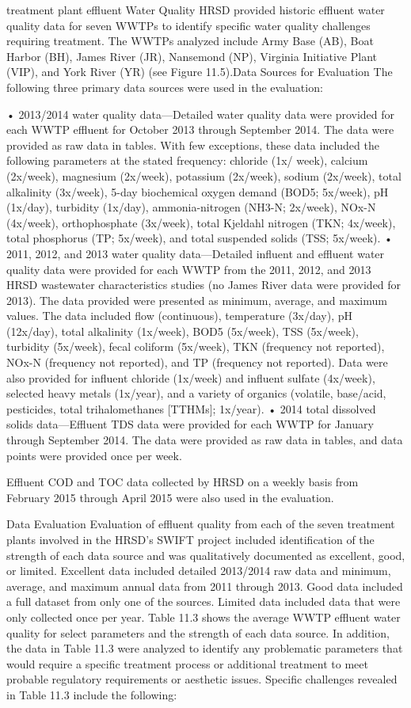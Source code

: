 \documentclass{article}
\begin{document}
treatment plant effluent Water Quality HRSD provided historic effluent
water quality data for seven WWTPs to identify specific water quality
challenges requiring treatment. The WWTPs analyzed include Army Base
(AB), Boat Harbor (BH), James River (JR), Nansemond (NP), Virginia
Initiative Plant (VIP), and York River (YR) (see Figure 11.5).Data
Sources for Evaluation The following three primary data sources were
used in the evaluation:

• 2013/2014 water quality data---Detailed water quality data were
provided for each WWTP effluent for October 2013 through September 2014.
The data were provided as raw data in tables. With few exceptions, these
data included the following parameters at the stated frequency: chloride
(1x/ week), calcium (2x/week), magnesium (2x/week), potassium (2x/week),
sodium (2x/week), total alkalinity (3x/week), 5-day biochemical oxygen
demand (BOD5; 5x/week), pH (1x/day), turbidity (1x/day),
ammonia-nitrogen (NH3-N; 2x/week), NOx-N (4x/week), orthophosphate
(3x/week), total Kjeldahl nitrogen (TKN; 4x/week), total phosphorus (TP;
5x/week), and total suspended solids (TSS; 5x/week). • 2011, 2012, and
2013 water quality data---Detailed influent and effluent water quality
data were provided for each WWTP from the 2011, 2012, and 2013 HRSD
wastewater characteristics studies (no James River data were provided
for 2013). The data provided were presented as minimum, average, and
maximum values. The data included flow (continuous), temperature
(3x/day), pH (12x/day), total alkalinity (1x/week), BOD5 (5x/week), TSS
(5x/week), turbidity (5x/week), fecal coliform (5x/week), TKN (frequency
not reported), NOx-N (frequency not reported), and TP (frequency not
reported). Data were also provided for influent chloride (1x/week) and
influent sulfate (4x/week), selected heavy metals (1x/year), and a
variety of organics (volatile, base/acid, pesticides, total
trihalomethanes {[}TTHMs{]}; 1x/year). • 2014 total dissolved solids
data---Effluent TDS data were provided for each WWTP for January through
September 2014. The data were provided as raw data in tables, and data
points were provided once per week.

Effluent COD and TOC data collected by HRSD on a weekly basis from
February 2015 through April 2015 were also used in the evaluation.

Data Evaluation Evaluation of effluent quality from each of the seven
treatment plants involved in the HRSD's SWIFT project included
identification of the strength of each data source and was qualitatively
documented as excellent, good, or limited. Excellent data included
detailed 2013/2014 raw data and minimum, average, and maximum annual
data from 2011 through 2013. Good data included a full dataset from only
one of the sources. Limited data included data that were only collected
once per year. Table 11.3 shows the average WWTP effluent water quality
for select parameters and the strength of each data source. In addition,
the data in Table 11.3 were analyzed to identify any problematic
parameters that would require a specific treatment process or additional
treatment to meet probable regulatory requirements or aesthetic issues.
Specific challenges revealed in Table 11.3 include the following:
\end{document}
